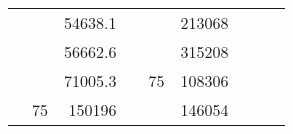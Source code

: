 \begin{table}[H]
\begin{tabular}{|ccrccrccc}
\multicolumn{1}{|c|}{\cellcolor[HTML]{FFFFC7}}                                & \multicolumn{1}{c|}{\cellcolor[HTML]{DAE8FC}}                      & \multicolumn{1}{r|}{\cellcolor[HTML]{DAE8FC}54638.1}   & \multicolumn{1}{c|}{\cellcolor[HTML]{FFFFC7}}                                & \multicolumn{1}{c|}{\cellcolor[HTML]{DAE8FC}}                       & \multicolumn{1}{r|}{\cellcolor[HTML]{DDFDFF}213068}    &                                                                              &                                                                    &                                                        \\ \cline{3-3} \cline{6-6}
\multicolumn{1}{|c|}{\cellcolor[HTML]{FFFFC7}}                                & \multicolumn{1}{c|}{\cellcolor[HTML]{DAE8FC}}                      & \multicolumn{1}{r|}{\cellcolor[HTML]{DDFDFF}56662.6}   & \multicolumn{1}{c|}{\cellcolor[HTML]{FFFFC7}}                                & \multicolumn{1}{c|}{\cellcolor[HTML]{DAE8FC}}                       & \multicolumn{1}{r|}{\cellcolor[HTML]{DAE8FC}315208}    &                                                                              &                                                                    &                                                        \\ \cline{3-3} \cline{6-6}
\multicolumn{1}{|c|}{\cellcolor[HTML]{FFFFC7}}                                & \multicolumn{1}{c|}{\cellcolor[HTML]{DAE8FC}}                      & \multicolumn{1}{r|}{\cellcolor[HTML]{DAE8FC}71005.3}   & \multicolumn{1}{c|}{\cellcolor[HTML]{FFFFC7}}                                & \multicolumn{1}{c|}{\multirow{-10}{*}{\cellcolor[HTML]{DAE8FC}75}}  & \multicolumn{1}{r|}{\cellcolor[HTML]{DDFDFF}108306}    &                                                                              &                                                                    &                                                        \\ \cline{3-3} \cline{5-6}
\multicolumn{1}{|c|}{\cellcolor[HTML]{FFFFC7}}                                & \multicolumn{1}{c|}{\multirow{-10}{*}{\cellcolor[HTML]{DAE8FC}75}} & \multicolumn{1}{r|}{\cellcolor[HTML]{DDFDFF}150196}    & \multicolumn{1}{c|}{\cellcolor[HTML]{FFFFC7}}                                & \multicolumn{1}{c|}{\cellcolor[HTML]{DDFDFF}}                       & \multicolumn{1}{r|}{\cellcolor[HTML]{DAE8FC}146054}    &                                                                              &                                                                    &                                                        \\ \cline{2-3} \cline{6-6}

\end{tabular}
\end{table}
